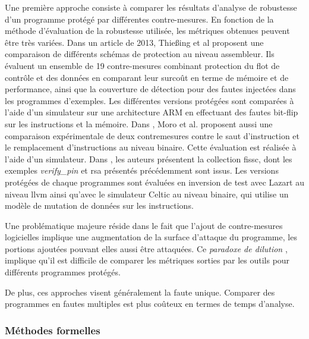                 Une première approche consiste à comparer les résultats d'analyse de robustesse d'un programme protégé par différentes contre-mesures. En fonction de la méthode d'évaluation de la robustesse utilisée, les métriques obtenues peuvent être très variées.
                Dans un article de 2013, Thie{\ss}ing et al \cite{theissing2013comprehensive} proposent une comparaison de différents schémas de protection au niveau assembleur. Ils évaluent un ensemble de 19 contre-mesures combinant protection du flot de contrôle et des données en comparant leur surcoût en terme de mémoire et de performance, ainsi que la couverture de détection pour des fautes injectées dans les programmes d'exemples.
                Les différentes versions protégées sont comparées à l'aide d'un simulateur sur une architecture ARM en effectuant des fautes bit-flip sur les instructions et la mémoire.
                Dans \cite{Moro/HOST14}, Moro et al. proposent aussi une comparaison expérimentale de deux contremesures contre le saut d'instruction et le remplacement d'instructions au niveau binaire. 
                Cette évaluation est réalisée à l'aide d'un simulateur.
                Dans \cite{Dureuil/PPLCC16}, les auteurs présentent la collection \gls{fissc}, dont les exemples \textit{verify\_pin} et \gls{rsa} présentés précédemment sont issus.
                Les versions protégées de chaque programmes sont évaluées en inversion de test avec Lazart \cite{Potet/ICST14} au niveau \gls{llvm} ainsi qu'avec le simulateur Celtic \cite{Werner/Phd22} au niveau binaire, qui utilise un modèle de mutation de données sur les instructions.
                
                Une problématique majeure réside dans le fait que l'ajout de contre-mesures logicielles implique une augmentation 
                de la surface d'attaque du programme, les portions ajoutées pouvant elles aussi être attaquées.
                Ce \textit{paradoxe de dilution} \cite{Dureuil/Phd16}, implique qu'il est difficile de comparer les métriques sorties par les outils pour différents programmes protégés. 
                
                De plus, ces approches visent généralement la faute unique. Comparer des programmes en fautes multiples est plus coûteux en termes de temps d'analyse.
                
            \subsubsection{Méthodes formelles}
                
